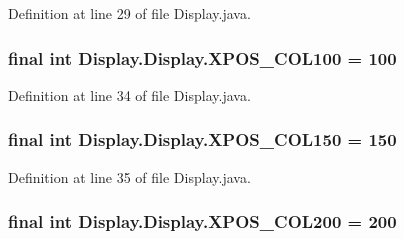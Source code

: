 Definition at line 29 of file Display.\+java.

\hypertarget{class_display_1_1_display_a0a8b9027490d3aa7d66834c6c12c0d35}{}
\subsubsection[{X\+P\+O\+S\+\_\+\+C\+O\+L100}]{\setlength{\rightskip}{0pt plus 5cm}final int Display.\+Display.\+X\+P\+O\+S\+\_\+\+C\+O\+L100 = 100\hspace{0.3cm}{\ttfamily [static]}}\label{class_display_1_1_display_a0a8b9027490d3aa7d66834c6c12c0d35}


Definition at line 34 of file Display.\+java.

\hypertarget{class_display_1_1_display_abc29a83a5afef24b6775c0c867d5ca2e}{}
\subsubsection[{X\+P\+O\+S\+\_\+\+C\+O\+L150}]{\setlength{\rightskip}{0pt plus 5cm}final int Display.\+Display.\+X\+P\+O\+S\+\_\+\+C\+O\+L150 = 150\hspace{0.3cm}{\ttfamily [static]}}\label{class_display_1_1_display_abc29a83a5afef24b6775c0c867d5ca2e}


Definition at line 35 of file Display.\+java.

\hypertarget{class_display_1_1_display_adbcb46204650409d834ab66950cdc370}{}
\subsubsection[{X\+P\+O\+S\+\_\+\+C\+O\+L200}]{\setlength{\rightskip}{0pt plus 5cm}final int Display.\+Display.\+X\+P\+O\+S\+\_\+\+C\+O\+L200 = 200\hspace{0.3cm}{\ttfamily [static]}}\label{class_display_1_1_display_adbcb46204650409d834ab66950cdc370}


